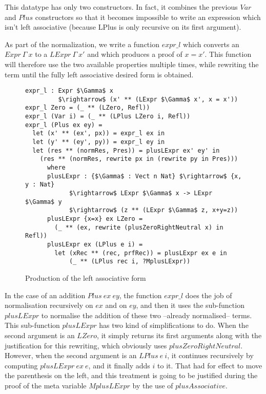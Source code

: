 This datatype has only two constructors. In fact, it combines the previous $Var$ and $Plus$ constructors so that it becomes impossible to write an expression which isn't left associative (because LPlus is only recursive on its first argument).
 
As part of the normalization, we write a function $expr\_l$ which converts an $Expr\ \Gamma\ x$ to a $LExpr\ \Gamma\ x'$ and which produces a proof of $x=x'$. This function will therefore use the two available properties multiple times, while rewriting the term until the fully left associative desired form is obtained.

\begin{figure}[H]
\figrule
\begin{center}
\begin{lstlisting}
expr_l : Expr $\Gamma$ x 
         $\rightarrow$ (x' ** (LExpr $\Gamma$ x', x = x'))
expr_l Zero = (_ ** (LZero, Refl))
expr_l (Var i) = (_ ** (LPlus LZero i, Refl))
expr_l (Plus ex ey) = 
  let (x' ** (ex', px)) = expr_l ex in
  let (y' ** (ey', py)) = expr_l ey in
  let (res ** (normRes, Pres)) = plusLExpr ex' ey' in
    (res ** (normRes, rewrite px in (rewrite py in Pres)))
      where 
      plusLExpr : {$\Gamma$ : Vect n Nat} $\rightarrow$ {x, y : Nat} 
            $\rightarrow$ LExpr $\Gamma$ x -> LExpr $\Gamma$ y  
            $\rightarrow$ (z ** (LExpr $\Gamma$ z, x+y=z))
      plusLExpr {x=x} ex LZero =
        (_ ** (ex, rewrite (plusZeroRightNeutral x) in Refl))            
      plusLExpr ex (LPlus e i) =
        let (xRec ** (rec, prfRec)) = plusLExpr ex e in
            (_ ** (LPlus rec i, ?MplusLExpr))

\end{lstlisting}
\end{center}
\caption{Production of the left associative form}
\label{expr_l}
\figrule
\end{figure}
In the case of an addition $Plus\ ex\ ey$, the function $expr\_l$ does the job of normalisation recursively on $ex$ and on $ey$, and then it uses the sub-function $plusLExpr$ to normalise the addition of these two --already normalised-- terms. This sub-function $plusLExpr$ has two kind of simplifications to do. When the second argument is an $LZero$, it simply returns its first arguments along with the justification for this rewriting, which obviously uses $plusZeroRightNeutral$. However, when the second argument is an $LPlus\ e\ i$, it continues recursively by computing $plusLExpr\ ex\ e$, and it finally adds $i$ to it. That had for effect to move the parenthesis on the left, and this treatment is going to be justified during the proof of the meta variable $MplusLExpr$ by the use of $plusAssociative$.

